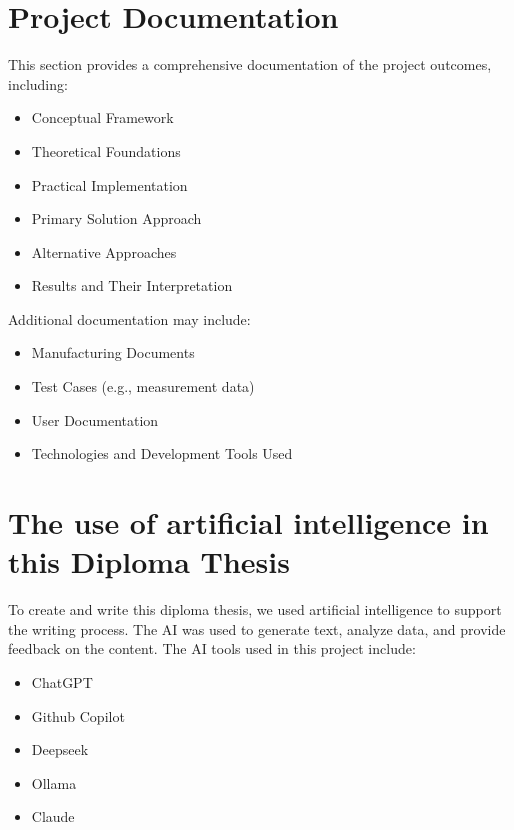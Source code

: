 \section{Project Documentation}

This section provides a comprehensive documentation of the project outcomes, including:

\begin{itemize}
    \item Conceptual Framework
    \item Theoretical Foundations
    \item Practical Implementation
    \item Primary Solution Approach
    \item Alternative Approaches
    \item Results and Their Interpretation
\end{itemize}

Additional documentation may include:

\begin{itemize}
    \item Manufacturing Documents
    \item Test Cases (e.g., measurement data)
    \item User Documentation
    \item Technologies and Development Tools Used
\end{itemize}



\section{The use of artificial intelligence in this Diploma Thesis}

To create and write this diploma thesis, we used artificial intelligence to support the writing process.
The AI was used to generate text, analyze data, and provide feedback on the content.
The AI tools used in this project include:
\begin{itemize}
    \item ChatGPT
    \item Github Copilot
    \item Deepseek
    \item Ollama
    \item Claude 
\end{itemize}

